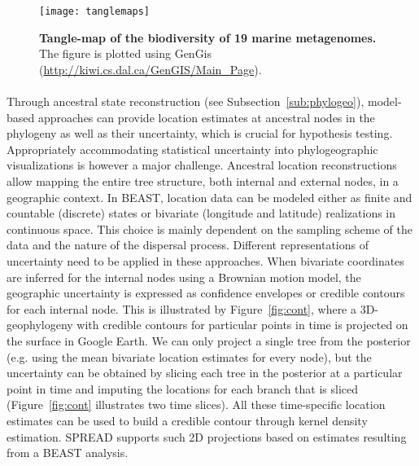 \begin{figure}[H]
\centering
\texttt{[image: tanglemaps]}
\caption{
{ \footnotesize 
{\bf Tangle-map of the biodiversity of 19 marine metagenomes.} 
The figure is plotted using GenGis (\url{http://kiwi.cs.dal.ca/GenGIS/Main_Page}).
} %
}
\label{fig:tanglemaps}
\end{figure}

\paragraph{}
Through ancestral state reconstruction (see Subsection~\ref{sub:phylogeo}), model-based approaches can provide location estimates at ancestral nodes in the phylogeny as well as their uncertainty, which is crucial for hypothesis testing.
Appropriately accommodating statistical uncertainty into phylogeographic visualizations is however a major challenge.
Ancestral location reconstructions allow mapping the entire tree structure, both internal and external nodes, in a geographic context.
In BEAST, location data can be modeled either as finite and countable (discrete) states or bivariate (longitude and latitude) realizations in continuous space.
This choice is mainly dependent on the sampling scheme of the data and the nature of the dispersal process.
Different representations of uncertainty need to be applied in these approaches.
When bivariate coordinates are inferred for the internal nodes using a Brownian motion model, the geographic uncertainty is expressed as confidence envelopes or credible contours for each internal node.
This is illustrated by Figure~\ref{fig:cont}, where a 3D-geophylogeny with credible contours for particular points in time is projected on the surface in Google Earth.
We can only project a single tree from the posterior (e.g. using the mean bivariate location estimates for every node), but the uncertainty can be obtained by slicing each tree in the posterior at a particular point in time and imputing the locations for each branch that is sliced (Figure~\ref{fig:cont} illustrates two time slices).
All these time-specific location estimates can be used to build a credible contour through kernel density estimation.
SPREAD supports such 2D projections based on estimates resulting from a BEAST analysis.

